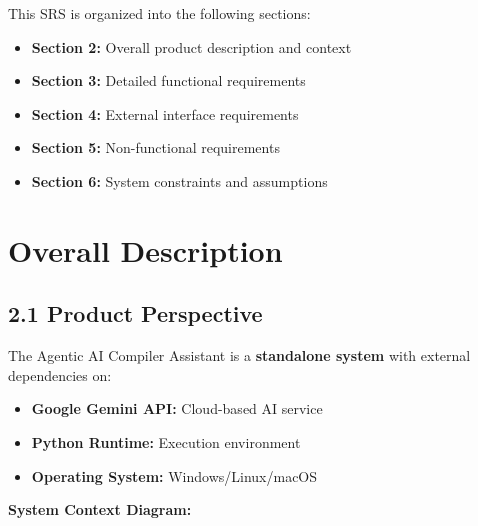 \documentclass[a4paper,11pt]{article}
\begin{document}
This SRS is organized into the following sections:
\begin{itemize}
    \item \textbf{Section 2:} Overall product description and context
    \item \textbf{Section 3:} Detailed functional requirements
    \item \textbf{Section 4:} External interface requirements
    \item \textbf{Section 5:} Non-functional requirements
    \item \textbf{Section 6:} System constraints and assumptions
\end{itemize}

\clearpage

\section{Overall Description}

\subsection{2.1 Product Perspective}

The Agentic AI Compiler Assistant is a \textbf{standalone system} with external dependencies on:
\begin{itemize}
    \item \textbf{Google Gemini API:} Cloud-based AI service
    \item \textbf{Python Runtime:} Execution environment
    \item \textbf{Operating System:} Windows/Linux/macOS
\end{itemize}

\textbf{System Context Diagram:}
\begin{center}
\end{center}
\end{document}
